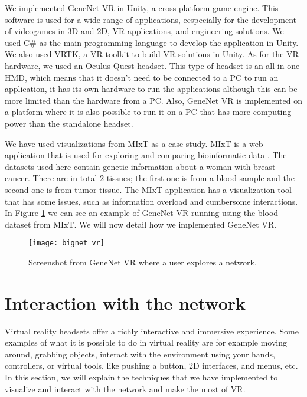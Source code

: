 We implemented GeneNet VR in Unity, a cross-platform game engine. This software is used for a wide range of applications, eespecially for the development of videogames in 3D and 2D, VR applications, and engineering solutions. We used C\# as the main programming language to develop the application in Unity. We also used VRTK, a VR toolkit to build VR solutions in Unity. As for the VR hardware, we used an Oculus Quest headset. This type of headset is an all-in-one HMD, which means that it doesn't need to be connected to a PC to run an application, it has its own hardware to run the applications although this can be more limited than the hardware from a PC. Also, GeneNet VR is implemented on a platform where it is also possible to run it on a PC that has more computing power than the standalone headset.

We have used visualizations from MIxT as a case study. MIxT is a web application that is used for exploring and comparing bioinformatic data  \cite{fjukstad_dumeaux_olsen_lund_hallett_bongo_2017}  \cite{dumeaux_fjukstad_interactions_tumor_blood}. The datasets used here contain genetic information about a woman with breast cancer. There are in total 2 tissues; the first one is from a blood sample and the second one is from tumor tissue. The MIxT application has a visualization tool that has some issues, such as information overload and cumbersome interactions. In Figure \ref{fig:bignet_vr} we can see an example of GeneNet VR running using the blood dataset from MIxT. We will now detail how we implemented GeneNet VR.

\begin{figure}[h!]
    \setlength{\tempheight}{15ex}
    \centering
    \texttt{[image: bignet\_vr]}
    \caption{Screenshot from GeneNet VR where a user explores a network.}
    \label{fig:bignet_vr}
\end{figure}

\section{Interaction with the network}
Virtual reality headsets offer a richly interactive and immersive experience. Some examples of what it is possible to do in virtual reality are for example moving around, grabbing objects, interact with the environment using your hands, controllers, or virtual tools, like pushing a button, 2D interfaces, and menus, etc. In this section, we will explain the techniques that we have implemented to visualize and interact with the network and make the most of VR.

